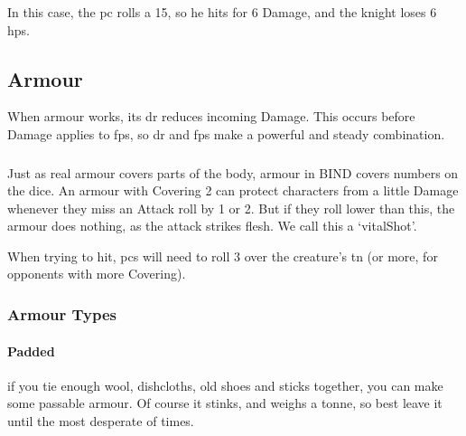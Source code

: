 \begin{multicols}{2}
{  In this case, the \gls{pc} rolls a 15, so he hits for 6 Damage, and the knight loses 6 \glspl{hp}.

}{

}

\subsection{Armour}



When armour works, its \gls{dr} reduces incoming Damage.
This occurs before Damage applies to \glspl{fp}, so \gls{dr} and \glspl{fp} make a powerful and steady combination.

\subsubsection{}
\label{vitals}
Just as real armour covers parts of the body, armour in BIND covers numbers on the dice.
An armour with Covering 2 can protect characters from a little Damage whenever they miss an Attack roll by 1 or 2.
But if they roll lower than this, the armour does nothing, as the attack strikes flesh.
We call this a `\gls{vitalShot}'.

When trying to hit, \glspl{pc} will need to roll 3 over the creature's \gls{tn} (or more, for opponents with more Covering).

\armourchart

\noindent
\subsubsection{Armour Types}

\paragraph{Padded}
if you tie enough wool, dishcloths, old shoes and sticks together, you can make some passable armour.
Of course it stinks, and weighs a tonne, so best leave it until the most desperate of times.


\end{multicols}
